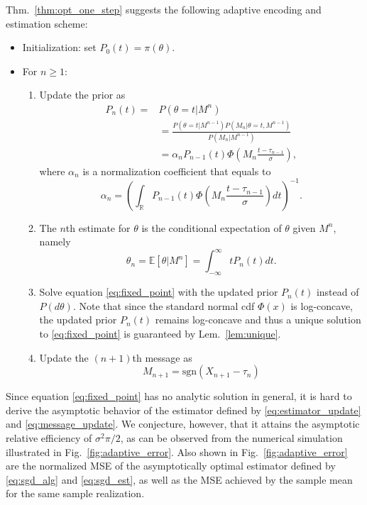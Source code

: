 \documentclass[letterpaper, conference]{IEEEtran}      %
\newcommand{\sgn}{\mathrm{sgn} }
\begin{document}
Thm.~\ref{thm:opt_one_step} suggests the following adaptive encoding and estimation scheme: 
\begin{itemize}
\item Initialization: set $P_0(t) = \pi(\theta)$.
\item For $n\geq 1$:
\begin{enumerate}
\item Update the prior as
\begin{align}
P_n(t) = & P(\theta=t |M^n) \\
& = \frac{ P\left( \theta=t | M^{n-1} \right) P(M_n | \theta = t , M^{n-1})  } { P(M_n | M^{n-1} )} \nonumber \\ 
& = \alpha_n  P_{n-1}(t) \Phi\left(M_n \frac{ t - \tau_{n-1} }{\sigma} \right), \label{eq:density_update}
\end{align}
where $\alpha_n$ is a normalization coefficient that equals to
\[
\alpha_n = \left(\int_{\mathbb R} P_{n-1}(t) \Phi\left(M_n \frac{t- \tau_{n-1} }{\sigma} \right)  dt \right)^{-1}. 
\]
\item The $n$th estimate for $\theta$ is the conditional expectation of $\theta$ given $M^n$, namely
\begin{equation}
\theta_n = \mathbb E \left[ \theta| M^n\right] = \int_{-\infty}^\infty t P_n(t) dt. \label{eq:estimator_update}
\end{equation}
\item Solve equation \eqref{eq:fixed_point} with the updated prior $P_n(t)$ instead of $P(d\theta)$. Note that since the standard normal cdf $\Phi(x)$ is log-concave, the updated prior $P_n(t)$ remains log-concave and thus a unique solution to \eqref{eq:fixed_point} is guaranteed by Lem.~\ref{lem:unique}. 
\item Update the $(n+1)$th message as
\begin{equation}\label{eq:message_update}
M_{n+1} = \sgn(X_{n+1}-\tau_n)
\end{equation}
\end{enumerate}
\end{itemize}
Since equation \eqref{eq:fixed_point} has no analytic solution in general, it is hard to derive the asymptotic behavior of the estimator defined by \eqref{eq:estimator_update} and \eqref{eq:message_update}. We conjecture, however, that it attains the asymptotic relative efficiency of $\sigma^2\pi/2$, as can be observed from the numerical simulation illustrated in Fig.~\ref{fig:adaptive_error}. Also shown in Fig.~\ref{fig:adaptive_error} are the normalized MSE of the asymptotically optimal estimator defined by \eqref{eq:sgd_alg} and \eqref{eq:sgd_est}, as well as the MSE achieved by the sample mean for the same sample realization. 
\end{document}
